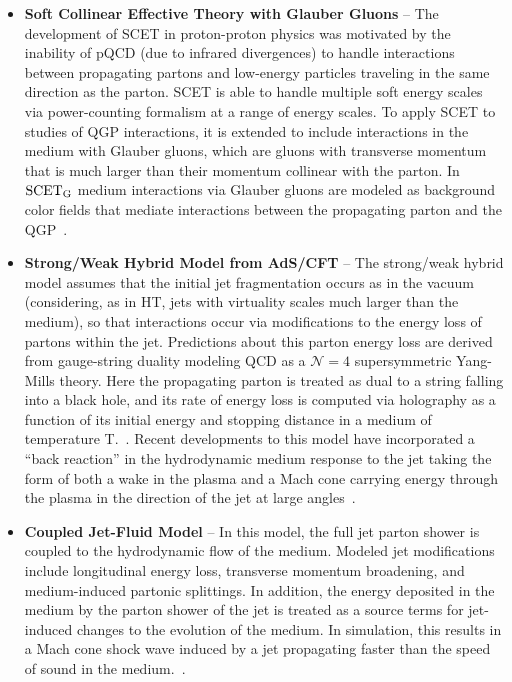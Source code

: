 \begin{itemize}
\item \textbf{Soft Collinear Effective Theory with Glauber Gluons } -- The development of SCET in proton-proton physics was motivated by the inability of pQCD (due to infrared divergences) to handle interactions between propagating partons and low-energy particles traveling in the same direction as the parton.  SCET is able to handle multiple soft energy scales via power-counting formalism at a range of energy scales.  To apply SCET to studies of QGP interactions, it is extended to include interactions in the medium with Glauber gluons, which are gluons with transverse momentum that is much larger than their momentum collinear with the parton.  In $\rm SCET_{G}$ medium interactions via Glauber gluons are modeled as background color fields that mediate interactions between the propagating parton and the QGP~\cite{Chien:2014nsa, Chien:2015hda, Rothstein:2016bsq}.

\item \textbf{Strong/Weak Hybrid Model from AdS/CFT} -- The strong/weak hybrid model assumes that the initial jet fragmentation occurs as in the vacuum (considering, as in HT, jets with virtuality scales much larger than the medium), so that interactions occur via modifications to the energy loss of partons within the jet.  Predictions about this parton energy loss are derived from gauge-string duality modeling QCD as a $\mathcal{N} = 4$ supersymmetric Yang-Mills theory.  Here the propagating parton is treated as dual to a string falling into a black hole, and its rate of energy loss is computed via holography as a function of its initial energy and stopping distance in a medium of temperature T.~\cite{Gubser:2009md, Gubser:2009sn, CasalderreySolana:2011us}.  Recent developments to this model have incorporated a ``back reaction'' in the hydrodynamic medium response to the jet taking the form of both a wake in the plasma and a Mach cone carrying energy through the plasma in the direction of the jet at large angles~\cite{Casalderrey-Solana:2016jvj}.

\item \textbf{Coupled Jet-Fluid Model} -- In this model, the full jet parton shower is coupled to the hydrodynamic flow of the medium.  Modeled jet modifications include longitudinal energy loss, transverse momentum broadening, and medium-induced partonic splittings.  In addition, the energy deposited in the medium by the parton shower of the jet is treated as a source terms for jet-induced changes to the evolution of the medium.  In simulation, this results in a Mach cone shock wave induced by a jet propagating faster than the speed of sound in the medium.~\cite{Tachibana:2017syd}. 

\end{itemize}


